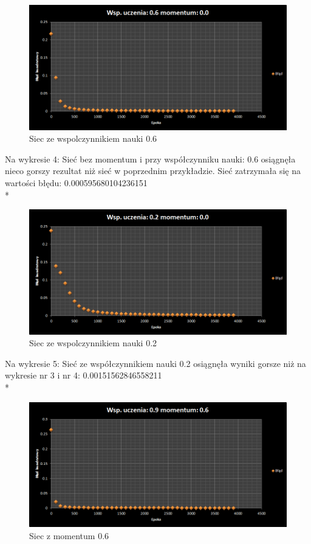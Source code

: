 \documentclass{classrep}
\begin{document}
\begin{figure}[ht]
\centering
			\includegraphics[scale=0.65]{pictures/test04.png}
	\caption{Siec ze wspolczynnikiem nauki 0.6}
	\label{fig:Siec ze wspolczynnikiem nauki 0.6}
\end{figure}

Na wykresie 4: Sieć bez momentum i przy współczynniku nauki: 0.6 osiągnęła nieco gorszy rezultat niż sieć w poprzednim przykładzie. Sieć zatrzymała się na wartości błędu: 0.000595680104236151
\\*

\begin{figure}[ht]
\centering
			\includegraphics[scale=0.65]{pictures/test05.png}
	\caption{Siec ze wspolczynnikiem nauki 0.2}
	\label{fig:Siec ze wspolczynnikiem nauki 0.2}
\end{figure}

Na wykresie 5: Sieć ze współczynnikiem nauki 0.2 osiągnęła wyniki gorsze niż na wykresie nr 3 i nr 4: 
0.00151562846558211 
\\*

\begin{figure}[ht]
\centering
			\includegraphics[scale=0.65]{pictures/test06.png}
	\caption{Siec z momentum 0.6}
	\label{fig:Siec z momentum 0.6}
\end{figure}
\end{document}
